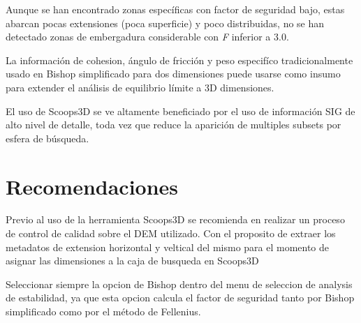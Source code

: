 Aunque se han encontrado zonas espec\'ificas con factor de seguridad bajo, estas abarcan pocas extensiones (poca superficie) y poco distribuidas, no se han detectado zonas de embergadura considerable con \textit{F} inferior a 3.0.

La informaci\'on de cohesion, \'angulo de fricci\'on y peso especif\'ico tradicionalmente usado en Bishop simplificado para dos dimensiones puede usarse como insumo para extender el an\'alisis  de equilibrio l\'imite a 3D dimensiones.

El uso de Scoops3D se ve altamente beneficiado por el uso de informaci\'on SIG de alto nivel de detalle, toda vez que reduce la aparici\'on de multiples subsets por esfera de b\'usqueda.



\section{Recomendaciones}

Previo al uso de la herramienta Scoops3D se recomienda en realizar un proceso de control de calidad sobre el DEM utilizado. Con el proposito de extraer los metadatos de extension horizontal y veltical del mismo para el momento de asignar las dimensiones a la caja de busqueda en Scoops3D

Seleccionar siempre la opcion de Bishop dentro del menu de seleccion de analysis de estabilidad, ya que esta opcion calcula el factor de seguridad tanto por Bishop simplificado como por el m\'etodo de Fellenius.
